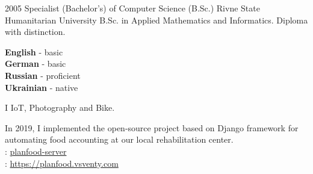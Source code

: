 \documentclass[9pt]{developercv} %
\begin{document}
\begin{entrylist}
	\entry
		{2005}
        {Specialist (Bachelor's) of Computer Science (B.Sc.)}
		{Rivne State Humanitarian University}
		{B.Sc. in Applied Mathematics and Informatics. Diploma with distinction.}
\end{entrylist}


\begin{minipage}[t]{0.3\textwidth}
	\vspace{-\baselineskip} %

	
	\textbf{English} - basic\\
	\textbf{German} - basic\\
    \textbf{Russian} - proficient\\
	\textbf{Ukrainian} - native
\end{minipage}
\hfill
\begin{minipage}[t]{0.3\textwidth}
	\vspace{-\baselineskip} %
	
	
    I \textcolor{red}\faHeart{} IoT, Photography and Bike.
\end{minipage}
\hfill
\begin{minipage}[t]{0.3\textwidth}
	\vspace{-\baselineskip} %
	
	
	In 2019, I implemented the open-source project based on Django framework for automating food accounting at our local rehabilitation center.\\
    \faGithub{}: {\href{https://github.com/vsventy/planfood-server/}{planfood-server}}\\
    \faLink{}: {\href{https://planfood.vsventy.com}{https://planfood.vsventy.com}}
\end{minipage}

\end{document}
